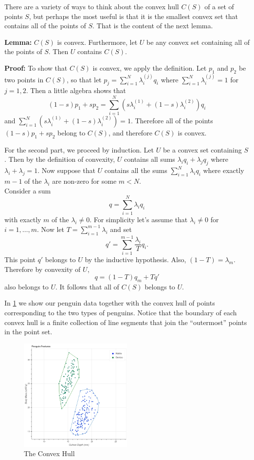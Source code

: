 \documentclass[
]{article}
\begin{document}
There are a variety of ways to think about the convex hull \(C(S)\) of a
set of points \(S\), but perhaps the most useful is that it is the
smallest convex set that contains all of the points of \(S\). That is
the content of the next lemma.

\textbf{Lemma:} \(C(S)\) is convex. Furthermore, let \(U\) be any convex
set containing all of the points of \(S\). Then \(U\) contains \(C(S)\).

\textbf{Proof:} To show that \(C(S)\) is convex, we apply the
definition. Let \(p_1\) and \(p_2\) be two points in \(C(S)\), so that
let \(p_{j}=\sum_{i=1}^{N} \lambda^{(j)}_{i}q_{i}\) where
\(\sum_{i=1}^{N}\lambda^{(j)}_{i} = 1\) for \(j=1,2\). Then a little
algebra shows that \[
(1-s)p_1+sp_{2} = \sum_{i=1}^{N} (s\lambda^{(1)}_{i}+(1-s)\lambda^{(2)}_{i})q_{i}
\] and
\(\sum_{i=1}^{N} (s\lambda^{(1)}_{i}+(1-s)\lambda^{(2)}_{i}) = 1\).
Therefore all of the points \((1-s)p_{1}+sp_{2}\) belong to \(C(S)\),
and therefore \(C(S)\) is convex.

For the second part, we proceed by induction. Let \(U\) be a convex set
containing \(S\). Then by the definition of convexity, \(U\) contains
all sums \(\lambda_{i}q_{i}+\lambda_{j}q_{j}\) where
\(\lambda_i+\lambda_j=1\). Now suppose that \(U\) contains all the sums
\(\sum_{i=1}^{N} \lambda_{i}q_{i}\) where exactly \(m-1\) of the
\(\lambda_{i}\) are non-zero for some \(m<N\).\\
Consider a sum \[
q = \sum_{i=1}^{N}\lambda_{i}q_{i}
\] with exactly \(m\) of the \(\lambda_{i}\not=0\). For simplicity let's
assume that \(\lambda_{i}\not=0\) for \(i=1,\ldots, m\). Now let
\(T=\sum_{i=1}^{m-1}\lambda_{i}\) and set \[
q' = \sum_{i=1}^{m-1}\frac{\lambda_{i}}{T}q_{i}.
\] This point \(q'\) belongs to \(U\) by the inductive hypothesis. Also,
\((1-T)=\lambda_{m}\). Therefore by convexity of \(U\), \[
q = (1-T)q_{m}+Tq'
\] also belongs to \(U\). It follows that all of \(C(S)\) belongs to
\(U\).

In \cref{fig:convexhull} we show our penguin data together with the
convex hull of points corresponding to the two types of penguins. Notice
that the boundary of each convex hull is a finite collection of line
segments that join the ``outermost'' points in the point set.

\begin{figure}
\hypertarget{fig:convexhull}{%
\centering
\includegraphics[width=0.5\textwidth,height=\textheight]{../img/penguinswithhulls.png}
\caption{The Convex Hull}\label{fig:convexhull}
}
\end{figure}
\end{document}
